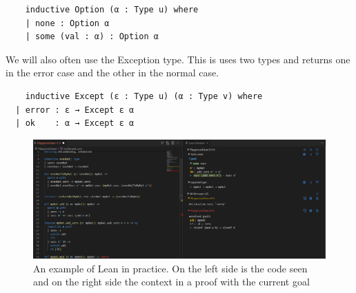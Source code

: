 \begin{lstlisting}
    inductive Option (α : Type u) where
    | none : Option α
    | some (val : α) : Option α
\end{lstlisting}

We will also often use the Exception type. This is uses two types and returns one in the error case and the other in the normal case.

\begin{lstlisting}
    inductive Except (ε : Type u) (α : Type v) where
  | error : ε → Except ε α
  | ok    : α → Except ε α
\end{lstlisting}

\begin{figure}
    \centering
    \includegraphics[scale=0.4]{Lean_example.png}
    \caption{An example of Lean in practice. On the left side is the code seen and on the right side the context in a proof with the current goal}
\end{figure}
